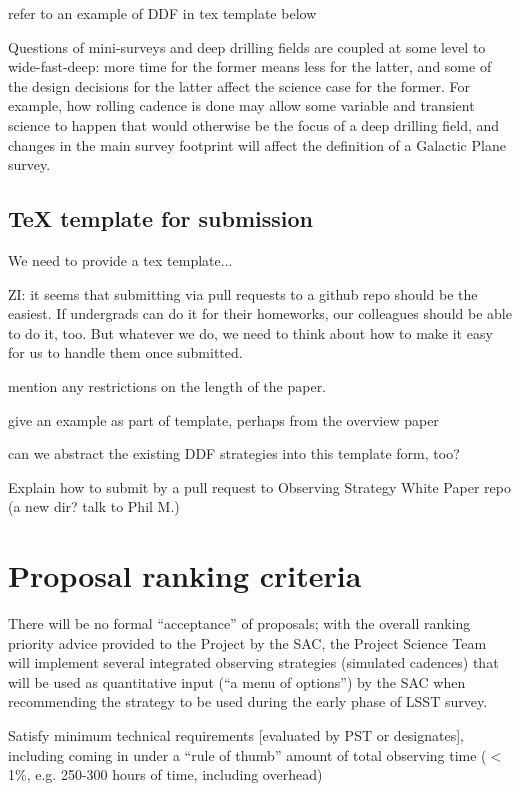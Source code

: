 \documentclass[DM,lsstdraft,toc,usenatbib]{lsstdoc}
\begin{document}
refer to an example of DDF in tex template below

Questions of
mini-surveys and deep drilling fields are coupled at some level to
wide-fast-deep: more time for the former means less for the latter,
and some of the design decisions for the latter affect the science
case for the former.  For example, how rolling cadence is done may
allow some variable and transient science to happen that would
otherwise be the focus of a deep drilling field, and changes in the
main survey footprint will affect the definition of a Galactic Plane
survey. 


\subsection{TeX template for submission} 

We need to provide a tex template... 

ZI: it seems that submitting via pull requests to a github repo should be the easiest. 
If undergrads can do it for their homeworks, our colleagues should be able to do it, too. 
But whatever we do, we need to think about how to make it easy for us to handle them
once submitted. 

mention any restrictions on the length of the paper. 

give an example as part of template, perhaps from the overview paper

can we abstract the existing DDF strategies into this template form, too? 


Explain how to submit by a pull request to Observing Strategy White Paper repo
(a new dir? talk to Phil M.) 




\section{Proposal ranking criteria} 

There will be no formal ``acceptance'' of proposals; with the overall ranking priority 
advice provided to the Project by the SAC, the Project Science Team will implement several 
integrated observing strategies (simulated cadences) that will be used as quantitative input
(``a menu of options'') by the SAC when recommending the strategy to be used during the 
early phase of LSST survey. 


Satisfy minimum technical requirements [evaluated by PST or designates], including coming in under a 
``rule of thumb'' amount of total observing time ($<$1\%, e.g. 250-300 hours of time, including overhead)
\end{document}
